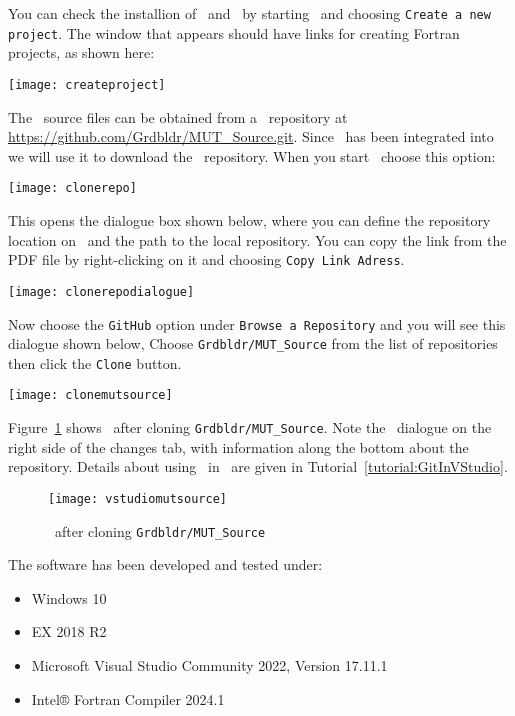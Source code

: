 You can check the installion of \vstudio\ and \ifort\ by starting \vstudio\ and choosing \texttt{Create a new project}.  The window that appears should have  links for creating Fortran projects, as shown here:

\texttt{[image: createproject]}

The \mut\ source files can be obtained from a \github\ repository at \url{https://github.com/Grdbldr/MUT_Source.git}.  Since \github\ has been integrated into \vstudio\, we will use it to download the \mut\ repository.  When you start \vstudio\, choose this option:

\texttt{[image: clonerepo]}

This opens the dialogue box shown below, where you can define the repository location on \github\ and the path to the local repository.  You can copy the link from the PDF file by right-clicking on it and choosing \texttt{Copy Link Adress}.

\texttt{[image: clonerepodialogue]}

Now choose the \texttt{GitHub} option under \texttt{Browse a Repository} and you will see this dialogue shown below, Choose \texttt{Grdbldr/MUT\_Source} from the list of repositories then click the \texttt{Clone} button.

  \texttt{[image: clonemutsource]}

Figure~\ref{fig:vstudiomutsource} shows \vstudio\ after cloning \texttt{Grdbldr/MUT\_Source}. Note the \github\ dialogue on the right side of the changes tab, with information along the bottom about the repository.  Details about using \github\ in \vstudio\ are given in Tutorial~\ref{tutorial:GitInVStudio}. \\
\begin{figure}
    \texttt{[image: vstudiomutsource]}
    \caption{\vstudio\ after cloning \texttt{Grdbldr/MUT\_Source}}
    \label{fig:vstudiomutsource}
\end{figure}

The software has been developed and tested under:
\begin{itemize}
    \item Windows 10
    \item {} EX 2018 R2
    \item Microsoft Visual Studio Community 2022, Version 17.11.1
    \item Intel® Fortran Compiler   2024.1
\end{itemize} 